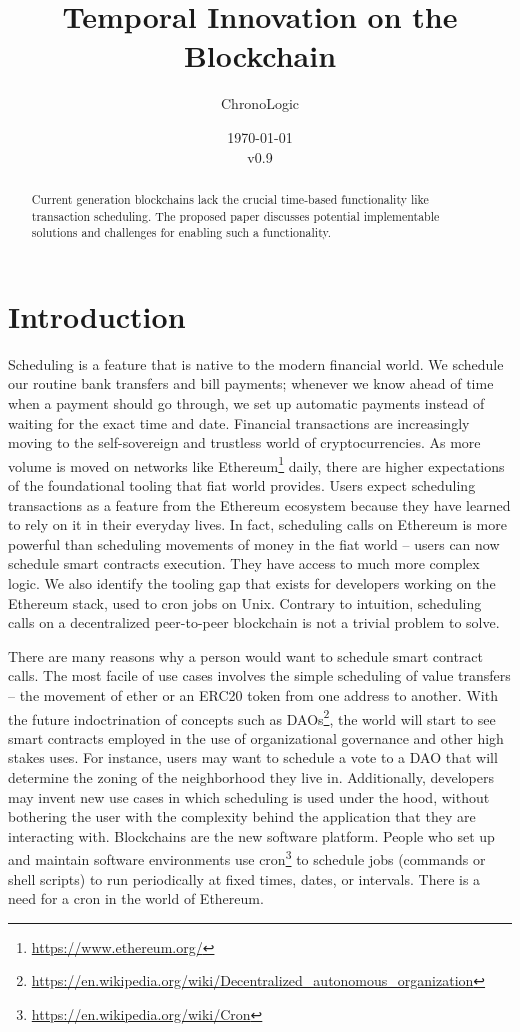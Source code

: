\documentclass{report}
\title{Temporal Innovation on the Blockchain}
\author{ChronoLogic}
\date{\today\\v0.9}
\begin{document}
  \maketitle
  \begin{abstract}
    Current generation blockchains lack the crucial time-based functionality like transaction scheduling. The proposed paper discusses potential implementable solutions and challenges for enabling such a functionality.
  \end{abstract}
  \newpage
  \tableofcontents
  \newpage
  \chapter{Introduction}
  Scheduling is a feature that is native to the modern financial world.
  We schedule our routine bank transfers and bill payments; whenever we know ahead of time when a payment should go through, we set up automatic payments instead of waiting for the exact time and date. Financial transactions are increasingly moving to the self-sovereign and trustless world of cryptocurrencies. As more volume is moved on networks like Ethereum\footnote{\url{https://www.ethereum.org/}} daily, there are higher expectations of the foundational tooling that fiat world provides. Users expect scheduling transactions as a feature from the Ethereum ecosystem because they have learned to rely on it in their everyday lives. In fact, scheduling calls on Ethereum is more powerful than scheduling movements of money in the fiat world -- users can now schedule smart contracts execution. They have access to much more complex logic. We also identify the tooling gap that exists for developers working on the Ethereum stack, used to cron jobs on Unix. Contrary to intuition, scheduling calls on a decentralized peer-to-peer blockchain is not a trivial problem to solve.

  There are many reasons why a person would want to schedule smart contract calls. The most facile of use cases involves the simple scheduling of value transfers -- the movement of ether or an ERC20 token from one address to another. With the future indoctrination of concepts such as DAOs\footnote{\url{https://en.wikipedia.org/wiki/Decentralized_autonomous_organization}}, the world will start to see smart contracts employed in the use of organizational governance and other high stakes uses. For instance, users may want to schedule a vote to a DAO that will determine the zoning of the neighborhood they live in. Additionally, developers may invent new use cases in which scheduling is used under the hood, without bothering the user with the complexity behind the application that they are interacting with. Blockchains are the new software platform. People who set up and maintain software environments use cron\footnote{\url{https://en.wikipedia.org/wiki/Cron}} to schedule jobs (commands or shell scripts) to run periodically at fixed times, dates, or intervals. There is a need for a cron in the world of Ethereum.
\end{document}
